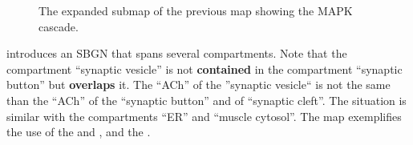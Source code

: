 \begin{figure}[htb]
\begin{center}
\caption{The expanded submap of the previous map showing the MAPK cascade.}\label{fig:mapk}
\end{center}
\end{figure}

 introduces an SBGN \PD that spans several compartments. Note that the compartment ``synaptic vesicle'' is not \textbf{contained} in the compartment ``synaptic button'' but \textbf{overlaps} it. The  ``ACh'' of the ''synaptic vesicle`` is not the same  than the ``ACh'' of the ``synaptic button'' and of ``synaptic cleft''.  The situation is similar with the compartments ``ER'' and ``muscle cytosol''.  The map exemplifies the use of the   and , and the  .

